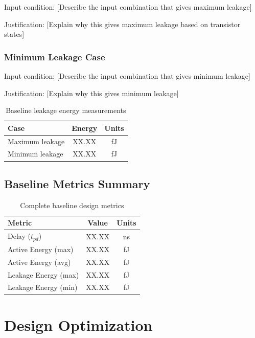 \documentclass[12pt,letterpaper]{article}
\begin{document}
Input condition: [Describe the input combination that gives maximum leakage]

Justification: [Explain why this gives maximum leakage based on transistor states]

\subsubsection{Minimum Leakage Case}

Input condition: [Describe the input combination that gives minimum leakage]

Justification: [Explain why this gives minimum leakage]

\begin{table}[H]
\centering
\caption{Baseline leakage energy measurements}
\label{tab:baseline_leakage}
\begin{tabular}{@{}lcc@{}}
\toprule
\textbf{Case} & \textbf{Energy} & \textbf{Units} \\
\midrule
Maximum leakage & XX.XX & fJ \\
Minimum leakage & XX.XX & fJ \\
\bottomrule
\end{tabular}
\end{table}

\subsection{Baseline Metrics Summary}

\begin{table}[H]
\centering
\caption{Complete baseline design metrics}
\label{tab:baseline_summary}
\begin{tabular}{@{}lcc@{}}
\toprule
\textbf{Metric} & \textbf{Value} & \textbf{Units} \\
\midrule
Delay ($t_{pd}$) & XX.XX & ns \\
Active Energy (max) & XX.XX & fJ \\
Active Energy (avg) & XX.XX & fJ \\
Leakage Energy (max) & XX.XX & fJ \\
Leakage Energy (min) & XX.XX & fJ \\
\bottomrule
\end{tabular}
\end{table}

\section{Design Optimization}
\label{sec:optimization}
\end{document}
